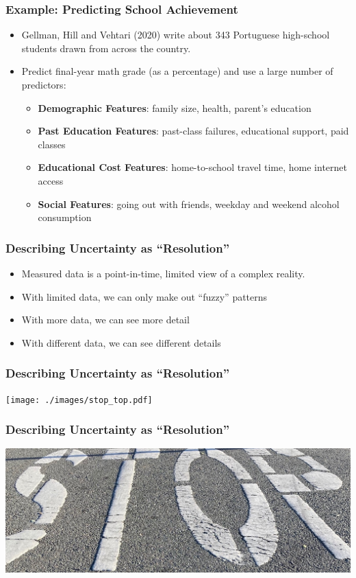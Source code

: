 \documentclass[12pt, block=fill]{beamer}
\begin{document}
\begin{frame}
  \frametitle{Example: Predicting School Achievement}
  \begin{itemize}
    \item Gellman, Hill and Vehtari
      (2020)  write about 343 Portuguese high-school students drawn
      from across the country.
      \item Predict final-year math grade (as a percentage) and use a large number of predictors:
  \begin{itemize}
    \item \textbf{Demographic Features}: family size, health, parent's education
    \item \textbf{Past Education Features}: past-class failures, educational support, paid classes
    \item \textbf{Educational Cost Features}:  home-to-school travel time, home internet access
    \item \textbf{Social Features}: going out with friends, weekday and weekend alcohol consumption
  \end{itemize}
  \end{itemize}
\end{frame}

\begin{frame}
  \frametitle{Describing Uncertainty as ``Resolution''}
  \begin{itemize}
    \item Measured data is a point-in-time, limited view of a complex reality.
    \item With limited data, we can only make out ``fuzzy'' patterns
    \item With more data, we can see more detail
    \item With different data, we can see different details
  \end{itemize}
\end{frame}

\begin{frame}
  \frametitle{Describing Uncertainty as ``Resolution''}
  \centering
  \texttt{[image: ./images/stop\_top.pdf]}
\end{frame}

\begin{frame}
  \frametitle{Describing Uncertainty as ``Resolution''}
  \begin{center}
    \includegraphics[width =
    1.1\textwidth]{./images/stop_mid_stretch.jpg}
   \end{center}
\end{frame}
\end{document}

